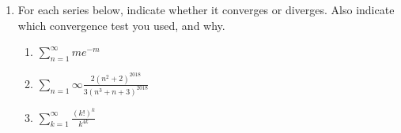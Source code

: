 \documentclass[12pt]{article}
\newcommand{\di}{\displaystyle}
\begin{document}
\begin{enumerate}
\newpage

\item For each series below, indicate whether it converges or diverges. Also indicate which convergence test you used, and why.
\begin{enumerate}
\item $\di \sum_{n=1}^\infty me^{-m}$

\vspace{2in}

\item $\di \sum_{n=1}\infty \frac{2(n^2+2)^{2018}}{3(n^3+n+3)^{2018}}$

\vspace{2in}

\item $\di \sum_{k=1}^\infty \frac{(k!)^k}{k^{4k}}$
\end{enumerate}
\end{enumerate}
\end{document}

